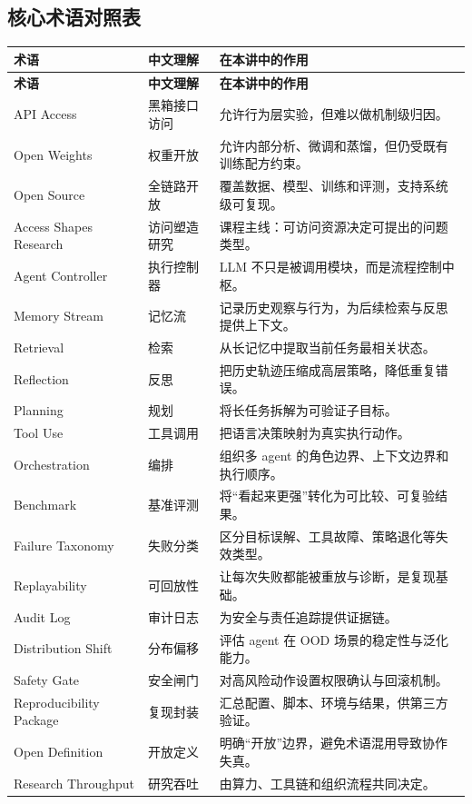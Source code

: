 \documentclass[a4paper]{article}
\begin{document}
\subsection{核心术语对照表}
\begin{longtable}{p{2.7cm}p{3.2cm}p{5.6cm}}
\toprule
\textbf{术语} & \textbf{中文理解} & \textbf{在本讲中的作用} \\
\midrule
\endfirsthead
\toprule
\textbf{术语} & \textbf{中文理解} & \textbf{在本讲中的作用} \\
\midrule
\endhead
API Access & 黑箱接口访问 & 允许行为层实验，但难以做机制级归因。 \\
Open Weights & 权重开放 & 允许内部分析、微调和蒸馏，但仍受既有训练配方约束。 \\
Open Source & 全链路开放 & 覆盖数据、模型、训练和评测，支持系统级可复现。 \\
Access Shapes Research & 访问塑造研究 & 课程主线：可访问资源决定可提出的问题类型。 \\
Agent Controller & 执行控制器 & LLM 不只是被调用模块，而是流程控制中枢。 \\
Memory Stream & 记忆流 & 记录历史观察与行为，为后续检索与反思提供上下文。 \\
Retrieval & 检索 & 从长记忆中提取当前任务最相关状态。 \\
Reflection & 反思 & 把历史轨迹压缩成高层策略，降低重复错误。 \\
Planning & 规划 & 将长任务拆解为可验证子目标。 \\
Tool Use & 工具调用 & 把语言决策映射为真实执行动作。 \\
Orchestration & 编排 & 组织多 agent 的角色边界、上下文边界和执行顺序。 \\
Benchmark & 基准评测 & 将“看起来更强”转化为可比较、可复验结果。 \\
Failure Taxonomy & 失败分类 & 区分目标误解、工具故障、策略退化等失效类型。 \\
Replayability & 可回放性 & 让每次失败都能被重放与诊断，是复现基础。 \\
Audit Log & 审计日志 & 为安全与责任追踪提供证据链。 \\
Distribution Shift & 分布偏移 & 评估 agent 在 OOD 场景的稳定性与泛化能力。 \\
Safety Gate & 安全闸门 & 对高风险动作设置权限确认与回滚机制。 \\
Reproducibility Package & 复现封装 & 汇总配置、脚本、环境与结果，供第三方验证。 \\
Open Definition & 开放定义 & 明确“开放”边界，避免术语混用导致协作失真。 \\
Research Throughput & 研究吞吐 & 由算力、工具链和组织流程共同决定。 \\
\bottomrule
\end{longtable}
\end{document}
